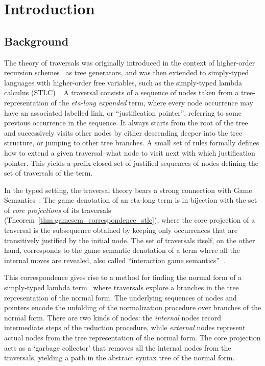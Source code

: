 \documentclass{elsarticle}
\theoremstyle{plain}
\theoremstyle{definition}
\begin{document}
\maketitle


\section{Introduction}

\subsection{Background}
The theory of traversals was originally introduced in the context of higher-order recursion schemes~\cite{OngLics2006} as tree generators, and was
then extended to simply-typed languages with higher-order free variables, such as the simply-typed lambda calculus (STLC)~\cite{BlumPhd}. A traversal consists of a sequence of nodes taken from a tree-representation of the \emph{eta-long expanded} term, where every node occurrence may have an associated labelled link, or ``justification pointer'', referring to some previous occurrence in the sequence. It always starts from the root of the tree and successively visits other nodes by either descending deeper into the tree structure, or jumping to other tree branches. A small set of rules formally defines how to extend a given traversal--what node to visit next with which justification pointer. This yields a prefix-closed set of justified sequences of nodes defining the set of traversals of the term.

In the typed setting, the traversal theory bears a strong connection with Game Semantics~\cite{BlumPhd}: The game denotation of an eta-long term is in bijection with the set of \emph{core projections} of its traversals (Theorem~\ref{thm:gamesem_correspondence_stlc}), where the core projection of a traversal is the subsequence obtained by keeping only occurrences that are
transitively justified by the initial node.
The set of traversals itself, on the other hand, corresponds to the game semantic denotation of a term where all the internal moves are revealed, also called ``interaction game semantics''~\cite{BlumPhd}.

This correspondence gives rise to a method for finding the normal form of a simply-typed lambda term~\cite{BlumPhd,BlumGalop2008,Blum-LocalBeta2008}
where traversals explore a branches in the tree representation of the normal form. The underlying sequences of nodes and pointers encode the unfolding of the normalization procedure over branches of the normal form. There are two kinds of nodes: the \emph{internal} nodes record intermediate steps of the reduction procedure, while \emph{external} nodes represent actual nodes from the tree representation of the normal form. The core projection acts as a `garbage collector' that removes all the internal nodes from the traversals,  yielding a path in the abstract syntax tree of the normal form.
\end{document}
